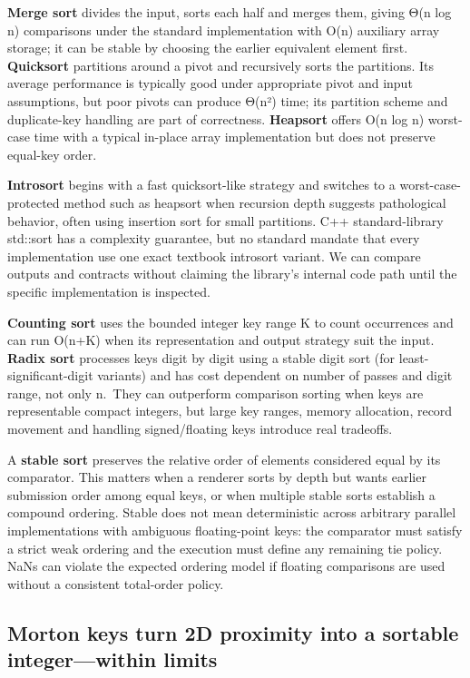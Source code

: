 \textbf{Merge sort} divides the input, sorts each half and merges them, giving Θ(n log n) comparisons under the standard implementation with O(n) auxiliary array storage; it can be stable by choosing the earlier equivalent element first. \textbf{Quicksort} partitions around a pivot and recursively sorts the partitions. Its average performance is typically good under appropriate pivot and input assumptions, but poor pivots can produce Θ(n²) time; its partition scheme and duplicate-key handling are part of correctness. \textbf{Heapsort} offers O(n log n) worst-case time with a typical in-place array implementation but does not preserve equal-key order.

\textbf{Introsort} begins with a fast quicksort-like strategy and switches to a worst-case-protected method such as heapsort when recursion depth suggests pathological behavior, often using insertion sort for small partitions. C++ standard-library std::sort has a complexity guarantee, but no standard mandate that every implementation use one exact textbook introsort variant. We can compare outputs and contracts without claiming the library's internal code path until the specific implementation is inspected.

\textbf{Counting sort} uses the bounded integer key range K to count occurrences and can run O(n+K) when its representation and output strategy suit the input. \textbf{Radix sort} processes keys digit by digit using a stable digit sort (for least-significant-digit variants) and has cost dependent on number of passes and digit range, not only n.~They can outperform comparison sorting when keys are representable compact integers, but large key ranges, memory allocation, record movement and handling signed/floating keys introduce real tradeoffs.

A \textbf{stable sort} preserves the relative order of elements considered equal by its comparator. This matters when a renderer sorts by depth but wants earlier submission order among equal keys, or when multiple stable sorts establish a compound ordering. Stable does not mean deterministic across arbitrary parallel implementations with ambiguous floating-point keys: the comparator must satisfy a strict weak ordering and the execution must define any remaining tie policy. NaNs can violate the expected ordering model if floating comparisons are used without a consistent total-order policy.

\subsection{Morton keys turn 2D proximity into a sortable integer---within limits}\label{01-foundations-i-ch008-morton-keys-turn-2d-proximity-into-a-sortable-integerwithin-limits}

